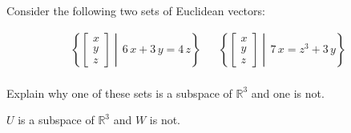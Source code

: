 
\begin{exerciseStatement}


Consider the following two sets of Euclidean vectors: 


\begin{align*}  \left\{ \left[\begin{array}{c}
x \\
y \\
z
\end{array}\right] \middle|\,6 \, x + 3 \, y = 4 \, z\right\}  & &   \left\{ \left[\begin{array}{c}
x \\
y \\
z
\end{array}\right] \middle|\,7 \, x = z^{3} + 3 \, y\right\}  \\ \end{align*}
            

 Explain why one of these sets is a subspace of \(\mathbb{R}^ 3 \) and one is not. 


\end{exerciseStatement}
    
\begin{exerciseAnswer} 


\(U\) is a subspace of \(\mathbb{R}^ 3 \) and \(W\) is not.


\end{exerciseAnswer}
    
